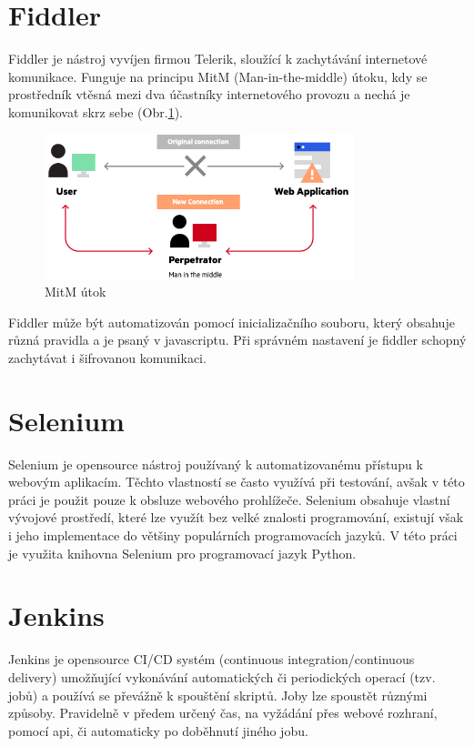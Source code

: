 \documentclass[thesis=M,czech,hidelinks]{FITthesis}[2013/05/06]
\begin{document}
\section{Fiddler}\label{sec:fiddler}
Fiddler\cite{fiddler} je nástroj vyvíjen firmou Telerik, sloužící k zachytávání internetové komunikace. Funguje na principu MitM (Man-in-the-middle) útoku, kdy se prostředník vtěsná mezi dva účastníky internetového provozu a nechá je komunikovat skrz sebe (Obr.\ref{fig:mitm}).
\begin{figure}[h]
	\centering
	\includegraphics[width=9cm]{pictures/mitm.png}
	\caption{MitM útok \cite{mitm}}
	\label{fig:mitm}
\end{figure}
Fiddler může být automatizován pomocí inicializačního souboru, který obsahuje různá pravidla a je psaný v javascriptu. Při správném nastavení je fiddler schopný zachytávat i šifrovanou komunikaci.

\section{Selenium} \label{sec:selenium}
Selenium je opensource nástroj používaný k automatizovanému přístupu k webovým aplikacím. Těchto vlastností se často využívá při testování, avšak v této práci je použit pouze k obsluze webového prohlížeče. Selenium obsahuje vlastní vývojové prostředí, které lze využít bez velké znalosti programování, existují však i jeho implementace do většiny populárních programovacích jazyků. V této práci je využita knihovna Selenium pro programovací jazyk Python.


\section{Jenkins} \label{sec:jenkins}
Jenkins je opensource CI/CD systém (continuous integration/continuous delivery) umožňující vykonávání automatických či periodických operací (tzv. jobů) a používá se převážně k spouštění skriptů. Joby lze spoustět různými způsoby. Pravidelně v předem určený čas, na vyžádání přes webové rozhraní, pomocí api, či automaticky po doběhnutí jiného jobu.
\end{document}
